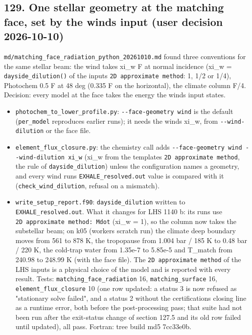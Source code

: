 \documentclass[english,a4paper]{my_memo}
\providecommand{\tightlist}{\setlength{\itemsep}{0pt}\setlength{\parskip}{0pt}}
\begin{document}
\subsection{129. One stellar geometry at the matching face, set by the wind\textquotesingle s input (user decision 2026-10-10)}\label{129-one-stellar-geometry-at-the-matching-face-set-by-the-winds-input-user-decision-2026-10-10}

\texttt{md/matching\_face\_radiation\_python\_20261010.md} found three conventions for the
same stellar beam: the wind takes xi\_w F at normal incidence (xi\_w =
\texttt{dayside\_dilution()} of the input\textquotesingle s \texttt{2D\ approximate\ method}: 1, 1/2 or 1/4),
Photochem 0.5 F at 48 deg (0.335 F on the horizontal), the climate column F/4.
Decision: every model at the face takes the energy the wind\textquotesingle s input states.

\begin{itemize}
\tightlist
\item
  \texttt{photochem\_to\_lower\_profile.py}: \texttt{-\/-face-geometry\ wind} is the default
  (\texttt{per\_model} reproduces earlier runs); it needs the wind\textquotesingle s xi\_w, from
  \texttt{-\/-wind-dilution} or the face file.
\item
  \texttt{element\_flux\_closure.py}: the chemistry call adds \texttt{-\/-face-geometry\ wind\ -\/-wind-dilution\ xi\_w} (xi\_w from the template\textquotesingle s \texttt{2D\ approximate\ method}, the
  rule of \texttt{dayside\_dilution}) unless the configuration names a geometry, and
  every wind run\textquotesingle s \texttt{EXHALE\_resolved.out} value is compared with it
  (\texttt{check\_wind\_dilution}, refusal on a mismatch).
\item
  \texttt{write\_setup\_report.f90}: \texttt{dayside\_dilution} written to \texttt{EXHALE\_resolved.out}.
  What it changes for LHS 1140 b: its runs use \texttt{2D\ approximate\ method:\ Mdot}
  (xi\_w = 1), so the column now takes the substellar beam; on k05 (worker\textquotesingle s
  scratch run) the climate deep boundary moves from 561 to 878 K, the tropopause
  from 1.004 bar / 185 K to 0.48 bar / 220 K, the cold-trap water from 1.35e-7 to
  5.85e-5 and T\_match from 240.98 to 248.99 K (with the face file). The
  \texttt{2D\ approximate\ method} of the LHS inputs is a physical choice of the model
  and is reported with every result.
  Tests: \texttt{matching\_face\_radiation} 16, \texttt{matching\_surface} 16,
  \texttt{element\_flux\_closure} 10 (one row updated: a status 3 is now refused as
  "stationary solve failed", and a status 2 without the certification\textquotesingle s
  closing line as a runtime error, both before the post-processing pass; that
  suite had not been run after the exit-status change of section 127.5 and its
  old row failed until updated), all pass. Fortran: tree build md5 7cc33e0b.
\end{itemize}
\end{document}
